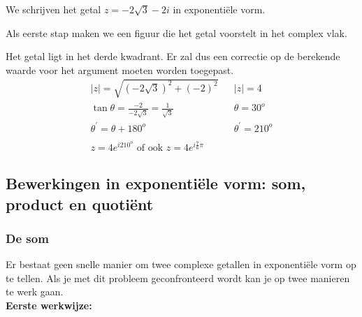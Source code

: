 \begin{voorbeeld}
	We schrijven het getal $z=-2\sqrt{3}-2i$ in exponenti\"{e}le vorm.\\

\vspace{0.3cm}

Als eerste stap maken we een figuur die het getal voorstelt in het complex vlak.\\

\begin{figure}[H]
	\centering 
	 
\end{figure}





Het getal ligt in het derde kwadrant. Er zal dus een correctie op de berekende waarde voor het argument moeten worden toegepast.\\

\[ \begin{array}{lll}
	|z|=\sqrt{(-2\sqrt{3})^2 +(-2)^2} & & |z|=4 \\
	\tan \theta = \frac{-2}{-2\sqrt{3}}=\frac{1}{\sqrt{3}} & & \theta = 30^{o}\\
	\theta^{'}=\theta+180^{o} & & \theta^{'}=210^{o} \\
	&  &          \\
	z=4e^{i210^{o}} \text{ of ook } z=4e^{i\frac{7}{6}\pi}  &  & 
\end{array} \]

\end{voorbeeld}

\subsection{Bewerkingen in exponenti\"{e}le vorm: som, product en quoti\"{e}nt} 

\subsubsection{De som}

Er bestaat geen snelle manier om twee complexe getallen in exponenti\"{e}le vorm op te tellen. Als je met dit probleem geconfronteerd wordt kan je op twee manieren te werk gaan.\\

{\bf Eerste werkwijze:} \\

